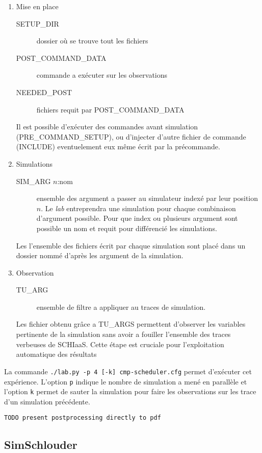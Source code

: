 \documentclass[parallelisme]{compas2017}
\begin{document}
\begin{enumerate}
	\item Mise en place
		\begin{description}
			\item[SETUP\_DIR] dossier où se trouve tout les fichiers
			\item[POST\_COMMAND\_DATA] commande a exécuter sur les
				observations
			\item[NEEDED\_POST] fichiers requit par POST\_COMMAND\_DATA 
		\end{description}
		Il est possible d'exécuter des commandes avant simulation
		(PRE\_COMMAND\_SETUP), ou d'injecter d'autre fichier de commande
		(INCLUDE) eventuelement eux même écrit par la précommande.
	\item Simulations
		\begin{description}
			\item[SIM\_ARG $n$:nom] ensemble des argument a
				passer au simulateur indexé par leur position
				$n$. Le \emph{lab} entreprendra une simulation
				pour chaque combinaison d'argument possible.
				Pour que index ou plusieurs argument sont
				possible un nom et requit pour différencié les
				simulations.
		\end{description}
		Les l'ensemble des fichiers écrit par chaque simulation sont placé
		dans un dossier nommé d'après les argument de la simulation.
	\item Observation
		\begin{description}
			\item[TU\_ARG] ensemble de filtre a appliquer au traces
				de simulation.
		\end{description}
		Les fichier obtenu grâce a TU\_ARGS permettent d'observer les
		variables pertinente de la simulation sans avoir a fouiller
		l'ensemble des traces verbeuses de SCHIaaS. Cette étape est
		cruciale pour l'exploitation automatique des résultats
\end{enumerate}

La commande \texttt{./lab.py -p 4 [-k] cmp-scheduler.cfg} permet d'exécuter cet
expérience. L'option \texttt{p} indique le nombre de simulation a mené en
parallèle et l'option \texttt{k} permet de sauter la simulation pour faire les
observations sur les trace d'un simulation précédente.

\begin{verbatim}
TODO present postprocessing directly to pdf
\end{verbatim}

\subsection{SimSchlouder}
\end{document}
